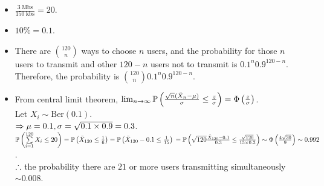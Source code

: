 \begin{pr}$ $
\begin{itemize}
\item $\frac{3\ \mathrm{Mbs}}{150\ \mathrm{kbs}}=20$.
\item $10\%=0.1$.
\item There are $\binom{120}n$ ways to choose $n$ users, and the probability for those $n$ users to transmit and other $120-n$ users not to transmit is $0.1^n0.9^{120-n}$.\\
Therefore, the probability is $\binom{120}n0.1^n0.9^{120-n}$.
\item %
From central limit theorem, $\lim_{n\to\infty}\P\left(\frac{\sqrt n(\bar X_n-\mu)}\sigma\leq\frac z\sigma\right)=\Phi\left(\frac z\sigma\right)$.\\
Let $X_i\sim\mathrm{Ber}(0.1)$.\\
$\then\mu=0.1, \sigma=\sqrt{0.1\times0.9}=0.3$.\\
$\P\left(\suml_{i=1}^{120}X_i\leq20\right)=\P\left(\bar X_{120}\leq\frac16\right)=\P\left(\bar X_{120}-0.1\leq\frac1{15}\right)\\
=\P\left(\sqrt{120}\frac{\bar X_{120}-0.1}{0.3}\leq\frac{\sqrt{120}}{15\times0.3}\right)\sim\Phi\left(\frac{4\sqrt{30}}9\right)\sim0.992$.\\
$\so$ the probability there are $21$ or more users transmitting simultaneously $\sim0.008$.
\end{itemize}
\end{pr}

